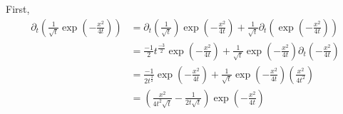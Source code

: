 \documentclass[letterpaper,11pt]{article}
\newcommand{\parens}[1]{\left(#1\right)}
\begin{document}
\begin{enumerate}
\begin{enumerate}
                First,
                \begin{align*}
                    \partial_t \parens{
                        \frac{1}{\sqrt{t}} \exp\parens{-\frac{x^2}{4t}}
                    }
                    &=
                    \partial_t \parens{
                        \frac{1}{\sqrt{t}}
                    }
                    \exp\parens{-\frac{x^2}{4t}}
                    +
                    \frac{1}{\sqrt{t}}
                    \partial_t \parens{
                        \exp\parens{-\frac{x^2}{4t}}
                    } \\
                    &=
                    \frac{-1}{2} t^{\frac{-3}{2}}
                    \exp\parens{-\frac{x^2}{4t}}
                    +
                    \frac{1}{\sqrt{t}}
                    \exp\parens{-\frac{x^2}{4t}}
                    \partial_t \parens{-\frac{x^2}{4t}} \\
                    &=
                    \frac{-1}{2 t^{\frac{3}{2}}}
                    \exp\parens{-\frac{x^2}{4t}}
                    +
                    \frac{1}{\sqrt{t}}
                    \exp\parens{-\frac{x^2}{4t}}
                    \parens{\frac{x^2}{4t^2}} \\
                    &=
                    \parens{
                        \frac{x^2}{
                            4
                            t^2
                            \sqrt{t}
                        }
                        -
                        \frac{1}{
                            2
                            t
                            \sqrt{t}
                        }
                    }
                    \exp\parens{-\frac{x^2}{4t}}
                \end{align*}


\end{enumerate}
\end{enumerate}
\end{document}
